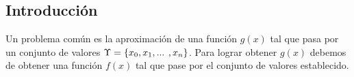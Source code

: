 \subsection{Introducción}
\par \vspace{2mm}
 Un problema común es la aproximación de una función \(g(x)\) tal que pasa por un conjunto de valores \(\Large{\Upsilon} = \left \{ x_0, x_1, ... \right. \left. ,x_n \right \}\). Para lograr obtener \(g(x)\) debemos de obtener una función \(f(x)\) tal que pase por el conjunto de valores establecido.
